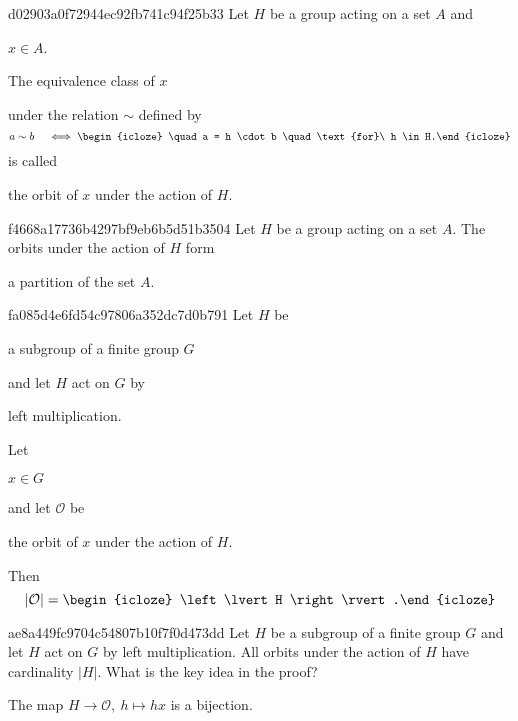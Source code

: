 \begin{note}{d02903a0f72944ec92fb741c94f25b33}
    Let \({ H }\) be a group acting on a set \({ A }\) and \begin{icloze}{4}\({ x \in A }\).\end{icloze}
    \begin{icloze}{3}The equivalence class of \({ x }\)\end{icloze} under the relation \({ \sim }\) defined by
    \[
        a \sim b \quad \iff \begin{icloze}{2}\quad a = h \cdot b \quad \text{for}\ h \in H.\end{icloze}
    \]
    is called \begin{icloze}{1}the orbit of \({ x }\) under the action of \({ H }\).\end{icloze}
\end{note}

\begin{note}{f4668a17736b4297bf9eb6b5d51b3504}
    Let \({ H }\) be a group acting on a set \({ A }\).
    The orbits under the action of \({ H }\) form \begin{icloze}{1}a partition of the set \({ A }\).\end{icloze}
\end{note}

\begin{note}{fa085d4e6fd54c97806a352dc7d0b791}
    Let \({ H }\) be \begin{icloze}{4}a subgroup of a finite group \({ G }\)\end{icloze} and let \({ H }\) act on \({ G }\) by \begin{icloze}{3}left multiplication.\end{icloze}
    Let \begin{icloze}{5}\({ x \in G }\)\end{icloze} and let \({ \mathcal O }\) be \begin{icloze}{2}the orbit of \({ x }\) under the action of \({ H }\).\end{icloze}
    Then
    \[
        \left\lvert \mathcal O \right\rvert = \begin{icloze}{1}\left\lvert H \right\rvert.\end{icloze}
    \]
\end{note}

\begin{note}{ae8a449fc9704c54807b10f7f0d473dd}
    Let \({ H }\) be a subgroup of a finite group \({ G }\) and let \({ H }\) act on \({ G }\) by left multiplication.
    All orbits under the action of \({ H }\) have  cardinality \({ \left\lvert H \right\rvert }\).
    What is the key idea in the proof?

    \begin{cloze}{1}
        The map \({ H \to \mathcal O,\: h \mapsto hx }\) is a bijection.
    \end{cloze}
\end{note}

